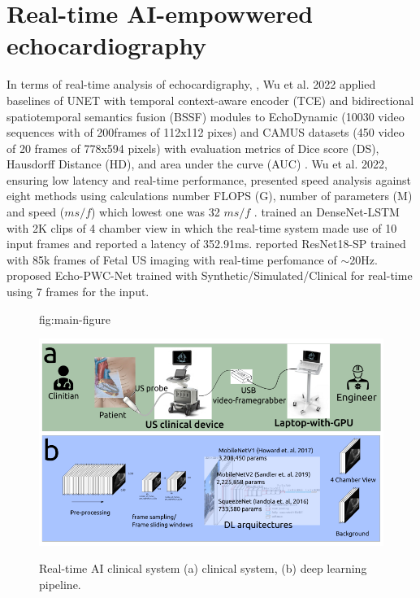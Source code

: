 \documentclass[mlabstract,twocolumn]{jmlr}
\begin{document}
\section{Real-time AI-empowwered echocardiography}
In terms of real-time analysis of echocardigraphy, , Wu et al. 2022 applied baselines of UNET with temporal context-aware encoder (TCE) and bidirectional spatiotemporal semantics fusion (BSSF) modules to EchoDynamic (10030 video sequences with of 200frames of 112x112 pixes) and CAMUS datasets  (450 video of 20 frames of 778x594 pixels) with evaluation metrics of Dice score (DS), Hausdorff Distance (HD), and area under the curve (AUC) \citep{wu20222}.
Wu et al. 2022, ensuring low latency and real-time performance, presented speed analysis against eight methods using calculations number FLOPS (G), number of parameters (M) and speed ($ms/f$) which lowest one was 32 $ms/f$  \citep{wu20222}.
\citet{woudenberg2018} trained an DenseNet-LSTM with 2K clips of 4 chamber view in which the real-time system made use of 10 input frames and reported a latency of 352.91ms.
\citet{toussaint2018-MICCAI} reported ResNet18-SP trained with 85k frames of Fetal US imaging with real-time perfomance of $\sim$20Hz.
\citet{ostvik2021-TMI} proposed Echo-PWC-Net trained with Synthetic/Simulated/Clinical  for real-time using 7 frames for the input.

\begin{figure}[htbp]
\floatconts
  {fig:main-figure}
  {\caption{Real-time AI clinical system (a) clinical system, (b) deep learning pipeline.}}
  {\includegraphics[width=\columnwidth]{../figures/main-figure/versions/drawing-v00}}%
\end{figure}
\end{document}
